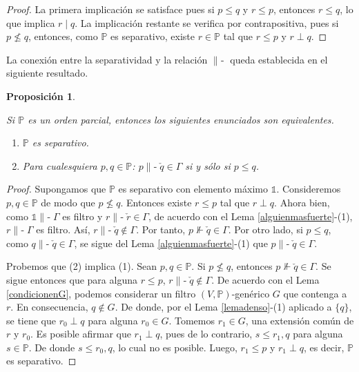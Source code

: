 \documentclass[11pt]{unam_tesis1}
\theoremstyle{MyThmStyle}
\theoremstyle{definition}
\theoremstyle{plain}
\newtheorem{proposition}[definition]{Proposici\'on}
\theoremstyle{remark}
\def\forces{\mathop{\parallel\!\!\!-}\nolimits}
\let\Vdash\forces
\let\leq\leqslant
\begin{document}
\begin{proof}
La primera implicaci\'on se satisface pues si $p\leq q$ y $r\leq p$, entonces $r\leq q$, lo que implica $r\mid q$. La implicaci\'on restante se verifica por contrapositiva, pues si $p\nleq q$, entonces, como $\mathbb P$ es separativo, existe $r\in \mathbb P$ tal que $r\leq p$ y $r\perp q$.
\end{proof}

La conexi\'on entre la separatividad y la relaci\'on $\Vdash$ queda establecida en el siguiente resultado.

\begin{proposition}\label{equivalenciaseparativa}

Si $\mathbb P$ es un orden parcial, entonces los siguientes enunciados son e\-qui\-va\-len\-tes.

\begin{enumerate}

\item $\mathbb P$ es separativo.
\item Para cualesquiera $p,q\in\mathbb P$: $p\Vdash \check q\in\Gamma$ si y s\'olo si $p\leq q$.

\end{enumerate}

\end{proposition}

\begin{proof}

Supongamos que $\mathbb P$ es separativo con elemento m\'aximo $\mathds 1$. Consideremos $p,q\in \mathbb P$ de modo que $p\nleq q$. Entonces existe $r\leq p$ tal que $r\perp q$. Ahora bien, como $\mathds 1\Vdash \Gamma$ es filtro y $r\Vdash \check{r}\in \Gamma$, de acuerdo con el Lema \ref{alguienmasfuerte}-(1), $r\Vdash \Gamma$ es filtro. As\'i, $r\Vdash \check{q}\notin \Gamma$. Por tanto, $p\nVdash \check{q}\in \Gamma$. Por otro lado, si $p\leq q$, como $q\Vdash \check{q}\in \Gamma$, se sigue del Lema \ref{alguienmasfuerte}-(1) que $p\Vdash \check{q}\in \Gamma$.

Probemos que (2) implica (1). Sean $p,q\in \mathbb P$. Si $p\nleq q$, entonces $p\nVdash \check{q}\in \Gamma$. Se sigue entonces que para alguna $r\leq p$, $r\Vdash \check{q}\notin \Gamma$. De acuerdo con el Lema \ref{condicionenG}, podemos considerar un filtro $(V,\mathbb P)$-gen\'erico $G$ que contenga a $r$. En consecuencia, $q\notin G$. De donde, por el Lema \ref{lemadenso}-(1) aplicado a $\{q\}$, se tiene que $r_0\perp q$ para alguna $r_0\in G$. Tomemos $r_1\in G$, una extensi\'on com\'un de $r$ y $r_0$. Es posible afirmar que $r_1\perp q$, pues de lo contrario, $s\leq r_1,q$ para alguna $s\in \mathbb P$. De donde $s\leq r_0,q$, lo cual no es posible. Luego, $r_1\leq p$ y $r_1\perp q$, es decir, $\mathbb P$ es separativo.
\end{proof}
\end{document}
